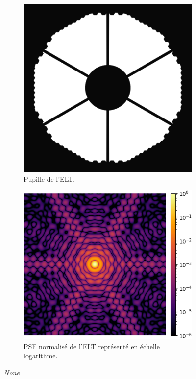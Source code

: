 \begin{figure}[htbp]
\centering
\begin{subfigure}[b]{0.40\textwidth}
\centering
\includegraphics[width=\textwidth]{figures/ELT_pupil.png}
\caption{Pupille de l'ELT. }
\end{subfigure}
\hfill
\begin{subfigure}[b]{0.46\textwidth}
\centering
\includegraphics[width=\textwidth]{figures/PSF_ELT.png}
\caption{PSF normalisé de l'ELT représenté en échelle logarithme.}
\end{subfigure}
\caption{\textit{None}}
\end{figure}


